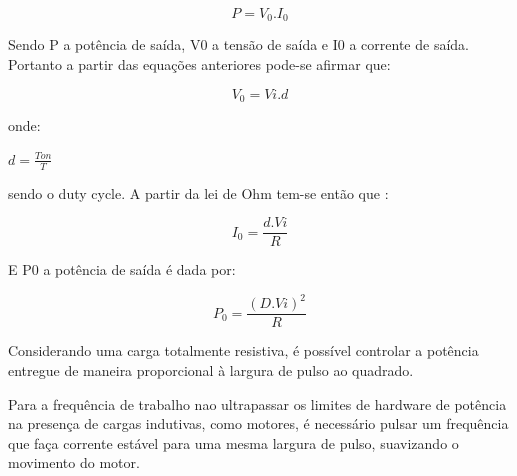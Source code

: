 \begin{enumerate}
					\begin{equation}
					P = V_{0} . I_{0}
					\end{equation}

					Sendo P a potência de saída, V0 a tensão de saída e I0 a corrente de saída. Portanto a partir das equações anteriores pode-se afirmar que:

					\begin{equation}
					V_{0} = Vi . d
					\end{equation}

					onde:

					$d = \frac{Ton}{T}$

					sendo  o duty cycle. A partir da lei de Ohm tem-se então que :

					\begin{equation}
					I_{0} = \frac{d . Vi}{R}
					\end{equation}

					E P0 a potência de saída é dada por:

					\begin{equation}
					P_{0} = \frac{(D . Vi)^{2}}{R}
					\end{equation}

					Considerando uma carga totalmente resistiva, é possível controlar a potência entregue de maneira proporcional à largura de pulso ao quadrado.

					Para a frequência de trabalho nao ultrapassar os limites de hardware de potência na presença de cargas indutivas, como motores, é necessário pulsar um frequência que faça corrente estável para uma mesma largura de pulso, suavizando o movimento do motor.

%




\end{enumerate}
